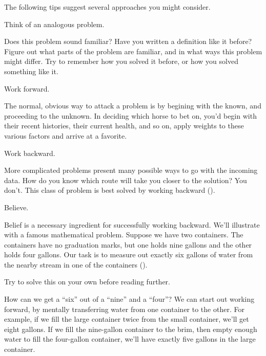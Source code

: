The following tips suggest several approaches you might consider.
\begin{tip}
Think of an analogous problem.
\end{tip}
Does this problem sound familiar? Have you written a definition like it
before? Figure out what parts of the problem are familiar, and in what
ways this problem might differ. Try to remember how you solved it
before, or how you solved something like it.
\begin{tip}
Work forward.
\end{tip}
The normal, obvious way to attack a problem is by begining with the
known, and proceeding to the unknown. In deciding which horse to bet
on, you'd begin with their recent histories, their current health, and so on,
apply weights to these various factors and arrive at a favorite.
\begin{tip}
Work backward.
\end{tip}
More complicated problems present many possible ways to go with the
incoming data. How do you know which route will take you closer to the
solution? You don't. This class of problem is best solved by working
backward ().



\begin{tip}
Believe.
\end{tip}
Belief is a necessary ingredient for successfully working backward. We'll
illustrate with a famous mathematical problem. Suppose we have two
containers. The containers have no graduation marks, but one holds nine
gallons and the other holds four gallons. Our task is to measure out exactly
six gallons of water from the nearby stream in one of the containers
().




Try to solve this on your own before reading further.

How can we get a ``six'' out of a ``nine'' and a ``four''? We can start
out working forward, by mentally transferring water from one container
to the other. For example, if we fill the large container twice from the
small container, we'll get eight gallons. If we fill the nine-gallon container
to the brim, then empty enough water to fill the four-gallon container,
we'll have exactly five gallons in the large container.

